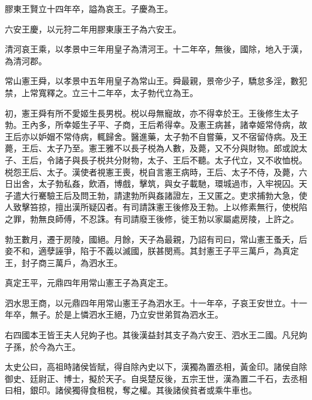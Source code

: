 膠東王賢立十四年卒，謚為哀王。子慶為王。

六安王慶，以元狩二年用膠東康王子為六安王。

清河哀王乘，以孝景中三年用皇子為清河王。十二年卒，無後，國除，地入于漢，為清河郡。

常山憲王舜，以孝景中五年用皇子為常山王。舜最親，景帝少子，驕怠多淫，數犯禁，上常寬釋之。立三十二年卒，太子勃代立為王。

初，憲王舜有所不愛姬生長男棁。棁以母無寵故，亦不得幸於王。王後修生太子勃。王內多，所幸姬生子平、子商，王后希得幸。及憲王病甚，諸幸姬常侍病，故王后亦以妒媢不常侍病，輒歸舍。醫進藥，太子勃不自嘗藥，又不宿留侍病。及王薨，王后、太子乃至。憲王雅不以長子棁為人數，及薨，又不分與財物。郎或說太子、王后，令諸子與長子棁共分財物，太子、王后不聽。太子代立，又不收恤棁。棁怨王后、太子。漢使者視憲王喪，棁自言憲王病時，王后、太子不侍，及薨，六日出舍，太子勃私姦，飲酒，博戲，擊筑，與女子載馳，環城過市，入牢視囚。天子遣大行騫驗王后及問王勃，請逮勃所與姦諸證左，王又匿之。吏求捕勃大急，使人致擊笞掠，擅出漢所疑囚者。有司請誅憲王後修及王勃。上以修素無行，使棁陷之罪，勃無良師傅，不忍誅。有司請廢王後修，徙王勃以家屬處房陵，上許之。

勃王數月，遷于房陵，國絕。月餘，天子為最親，乃詔有司曰，常山憲王蚤夭，后妾不和，適孽誣爭，陷于不義以滅國，朕甚閔焉。其封憲王子平三萬戶，為真定王，封子商三萬戶，為泗水王。

真定王平，元鼎四年用常山憲王子為真定王。

泗水思王商，以元鼎四年用常山憲王子為泗水王。十一年卒，子哀王安世立。十一年卒，無子。於是上憐泗水王絕，乃立安世弟賀為泗水王。

右四國本王皆王夫人兒姁子也。其後漢益封其支子為六安王、泗水王二國。凡兒姁子孫，於今為六王。

太史公曰，高祖時諸侯皆賦，得自除內史以下，漢獨為置丞相，黃金印。諸侯自除御史、廷尉正、博士，擬於天子。自吳楚反後，五宗王世，漢為置二千石，去丞相曰相，銀印。諸侯獨得食租稅，奪之權。其後諸侯貧者或乘牛車也。